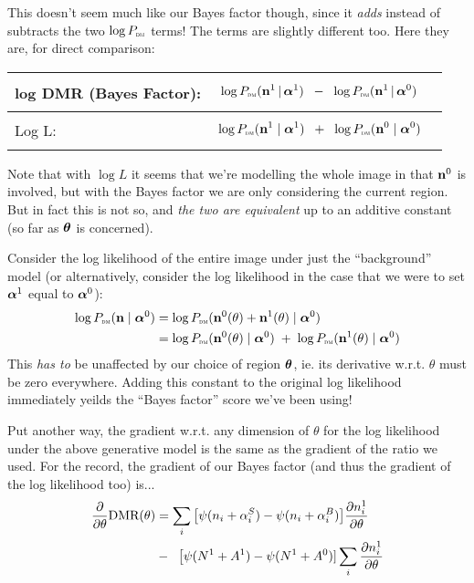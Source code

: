 \documentclass[12pt]{article}
\begin{document}
This doesn't seem much like our Bayes factor though, since it
\emph{adds} instead of subtracts the two $\log P_\text{\tiny\sc dm}$ terms! The terms
are slightly different too.  Here they are, for direct comparison:

\begin{tabular}{|l|l|}
\hline
log DMR (Bayes Factor): & 
\parbox{.7\textwidth}{
\begin{align*}
&\log P_\text{\tiny\sc dm}(\mathbf{n}^1 \,|\, \boldsymbol\alpha^1) \;\;-\;\; \log P_\text{\tiny\sc dm}(\mathbf{n}^1 \,|\, \boldsymbol\alpha^0)
\end{align*}
} \\
\hline
Log L: & 
\parbox{.7\textwidth}{
\begin{align*}
& \log P_\text{\tiny\sc dm}(\mathbf{n}^1 \mid \boldsymbol\alpha^1) \;\; + \;\; \log P_\text{\tiny\sc dm}(\mathbf{n}^0 \mid \boldsymbol\alpha^0)
\end{align*}
} \\
\hline
\end{tabular}

Note that with $\log L$ it seems that we're modelling the whole image
in that $\mathbf{n}^0$ is involved, but with the Bayes factor we are only
considering the current region. But in fact this is not so, and {\it
  the two are equivalent} up to an additive constant (so far as
$\boldsymbol\theta$ is concerned).

Consider the log likelihood of the entire image under just the
``background'' model (or alternatively, consider the log likelihood in the case that we were to set $\boldsymbol\alpha^1$ equal to $\boldsymbol\alpha^0$):
\begin{align*}
\log P_\text{\tiny\sc dm}(\mathbf{n} \mid \boldsymbol\alpha^0) 
&= \log P_\text{\tiny\sc dm}(\mathbf{n}^0(\theta) + \mathbf{n}^1(\theta) \mid \boldsymbol\alpha^0)  \\
&= \log P_\text{\tiny\sc dm}(\mathbf{n}^0(\theta) \mid \boldsymbol\alpha^0) \; + \; \log P_\text{\tiny\sc dm}(\mathbf{n}^1(\theta) \mid \boldsymbol\alpha^0) 
\end{align*}
This \emph{has to} be unaffected by our choice of region $\boldsymbol\theta$,
ie. its derivative w.r.t. $\theta$ must be zero everywhere.  Adding
this constant to the original log likelihood immediately yeilds the
``Bayes factor'' score we've been using!

Put another way, the gradient w.r.t. any dimension of $\theta$ for the
log likelihood under the above generative model is the same as the
gradient of the ratio we used.  For the record, the gradient of our
Bayes factor (and thus the gradient of the log likelihood too) is...
\begin{align}
\frac{\partial}{\partial\theta}\text{DMR}(\theta) 
&= \sum_i \big[ \psi(n_i + \alpha^S_i) - \psi(n_i + \alpha^B_i) \big] \frac{\partial n^1_i}{\partial\theta} \notag\\
& - \;\; \big[\psi(N^1+A^1) - \psi(N^1+A^0)]\sum_i \frac{\partial n^1_i}{\partial\theta}
\end{align}
\end{document}
